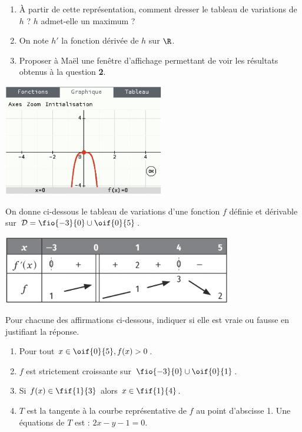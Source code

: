 \documentclass[a4paper,11pt,exos]{nsi} %
\begin{document}
\begin{minipage}{9.5cm}
	\begin{enumerate}
		\item 	À partir de cette représentation, comment dresser le tableau de variations de $h$ ? $h$ admet-elle un maximum ?
		\item 	On note $h'$ la fonction dérivée de $h$ sur $\R$.
	\item	Proposer à Maël une fenêtre d'affichage permettant de voir les résultats obtenus à la question \textbf{2}.
	\end{enumerate}
\end{minipage}
\begin{minipage}{7.5cm}
	\begin{flushright}
		\includegraphics[width=7cm]{calculatrice}
	\end{flushright}
\end{minipage}


\exo{}
On donne ci-dessous le tableau de variations d'une fonction $f$ définie et dérivable sur $\mathcal{D}=\fio{-3}{0}\cup\oif{0}{5}$.
\begin{center}
	\includegraphics[width=10cm]{tableau2}
\end{center}
Pour chacune des affirmations ci-dessous, indiquer si elle est vraie ou fausse en justifiant la réponse.
\begin{enumerate}
	\item 	Pour tout $x\in\oif{0}{5}, f(x)>0$.
	\item 	$f$ est strictement croissante sur $\fio{-3}{0}\cup\oif{0}{1}$.
	\item	Si $f(x)\in \fif{1}{3}$ alors $x\in\fif{1}{4}$.
	\item	$T$ est la tangente à la courbe représentative de $f$ au point d'abscisse 1. Une équations de $T$ est : $2x-y-1=0$.	
\end{enumerate}
\end{document}
